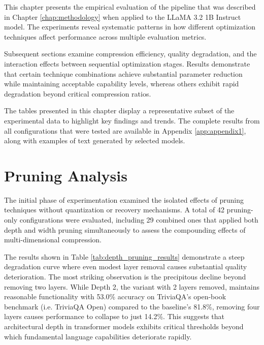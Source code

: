 

This chapter presents the empirical evaluation of the pipeline that was described in Chapter \ref{chap:methodology} when applied to the LLaMA 3.2 1B Instruct model. The experiments reveal systematic patterns in how different optimization techniques affect performance across multiple evaluation metrics.

Subsequent sections examine compression efficiency, quality degradation, and the interaction effects between sequential optimization stages. Results demonstrate that certain technique combinations achieve substantial parameter reduction while maintaining acceptable capability levels, whereas others exhibit rapid degradation beyond critical compression ratios.

The tables presented in this chapter display a representative subset of the experimental data to highlight key findings and trends. The complete results from all configurations that were tested are available in Appendix \ref{app:appendix1}, along with examples of text generated by selected models.

\section{Pruning Analysis}

The initial phase of experimentation examined the isolated effects of pruning techniques without quantization or recovery mechanisms. A total of 42 pruning-only configurations were evaluated, including 29 combined ones that applied both depth and width pruning simultaneously to assess the compounding effects of multi-dimensional compression.

The results shown in Table \ref{tab:depth_pruning_results} demonstrate a steep degradation curve where even modest layer removal causes substantial quality deterioration. The most striking observation is the precipitous decline beyond removing two layers. While Depth 2, the variant with 2 layers removed, maintains reasonable functionality with 53.0\% accuracy on TriviaQA's open-book benchmark (i.e. TriviaQA Open) compared to the baseline's 81.8\%, removing four layers causes performance to collapse to just 14.2\%. This suggests that architectural depth in transformer models exhibits critical thresholds beyond which fundamental language capabilities deteriorate rapidly.

